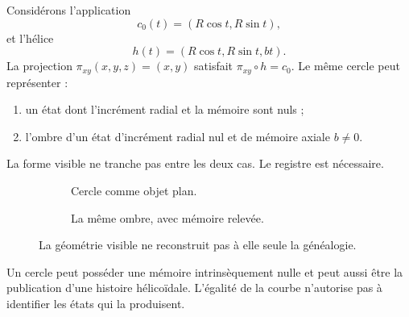 Considérons l'application
\[
 c_0(t)=(R\cos t,R\sin t),
\]
et l'hélice
\[
 h(t)=(R\cos t,R\sin t,bt).
\]
La projection \(\pi_{xy}(x,y,z)=(x,y)\) satisfait \(\pi_{xy}\circ h=c_0\). Le même cercle peut représenter :
\begin{enumerate}
\item un état dont l'incrément radial et la mémoire sont nuls ;
\item l'ombre d'un état d'incrément radial nul et de mémoire axiale \(b\neq0\).
\end{enumerate}
La forme visible ne tranche pas entre les deux cas. Le registre est nécessaire.

\begin{figure}[htbp]
\centering
\begin{subfigure}[t]{.46\textwidth}
\centering
{}
\caption{Cercle comme objet plan.}
\end{subfigure}\hfill
\begin{subfigure}[t]{.46\textwidth}
\centering
{}
\caption{La même ombre, avec mémoire relevée.}
\end{subfigure}
\caption{La géométrie visible ne reconstruit pas à elle seule la généalogie.}
\label{espiral:fig:circulo-helice}
\end{figure}

\begin{resultbox}[title={Défaut de fidélité de l'évaluation archimédienne sur les classes généalogiques}]
Un cercle peut posséder une mémoire intrinsèquement nulle et peut aussi être la publication d'une histoire hélicoïdale. L'égalité de la courbe n'autorise pas à identifier les états qui la produisent.
\end{resultbox}

